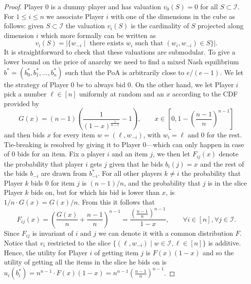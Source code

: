 \begin{proof}
  Player 0 is a dummy player and has valuation $ v_0(S) = 0 $ for all $ S \subset \mathcal{I} $. For $ 1\leq i \leq n $ we associate Player $ i $ with one of the dimensions in the cube as follows: given $ S \subset \mathcal{I} $ the valuation $ v_i(S) $ is the cardinality of $ S $ projected along dimension $ i $ which more formally can be written as
  \begin{equation}
    v_i(S) = |\{w_{-i} \mid \text{ there exists }w_i\text{ such that } (w_i, w_{-i}) \in S\}|.
  \end{equation}
  It is straightforward to check that these valuations are submodular. To give a lower bound on the price of anarchy we need to find a mixed Nash equilibrium $ b^{*} = (b_0^{*}, b_1^{*}, \ldots, b_n^{*}) $ such that the PoA is arbitrarily close to $ e /(e - 1) $. We let the strategy of Player 0 be to always bid 0. On the other hand, we let Player $ i $ pick a number $ \ell \in [n] $ uniformly at random and an $ x $ according to the CDF provided by
  \begin{equation}
    G(x) = (n - 1)\left( \frac{1}{(1-x)^{\frac{1}{n-1}}} - 1 \right),\quad \quad  x \in \left[ 0, 1 - \left( \frac{n-1}{n}\right)^{n - 1} \right]
  \end{equation}
  and then bids $ x $ for every item $ w = (\ell, w_{-i}) $, with $ w_i = \ell $ and 0 for the rest. Tie-breaking is resolved by giving it to Player 0---which can only happen in case of 0 bids for an item. Fix a player $ i $ and an item $ j $, we then let $ F_{ij}(x) $ denote the probability that player $ i $ gets $ j $ given that he bids $ b_i(j) = x $ and the rest of the bids $ b_{-i} $ are drawn from $ b^{*}_{-i} $. For all other players $ k\neq i $ the probability that Player $ k $ bids 0 for item $ j $ is $ (n - 1)/n $, and the probability that $ j $ is in the slice Player $ k $ bids on, but for which his bid is lower than $ x $, is $ 1 /n\cdot G(x) = G(x)/n $. From this it follows that
  \begin{equation}
    F_{ij}(x) = \left( \frac{G(x)}{n} + \frac{n -1}{n} \right)^{n - 1} = \frac{\left( \frac{n-1}{n} \right)^{n-1}}{1  -x},\quad\quad \forall i\in [n],\forall j\in \mathcal{I}.
  \end{equation}
  Since $ F_{ij} $ is invariant of $ i $ and $ j $ we can denote it with a common distribution $ F $.
  Notice that $ v_i $ restricted to the slice $ \{(\ell, w_{-i}) \mid w\in \mathcal{I}, \ell \in [n]\} $ is additive. Hence, the utility for Player $ i $ of getting item $ j $ is $ F(x)(1 - x) $ and so the utility of getting all the items in the slice he bids on is $ u_i(b^{*}_i) = n^{n-1}\cdot F(x)(1 - x) = n^{n - 1} \left( \frac{n - 1}{n} \right)^{n - 1} $.



\end{proof}
